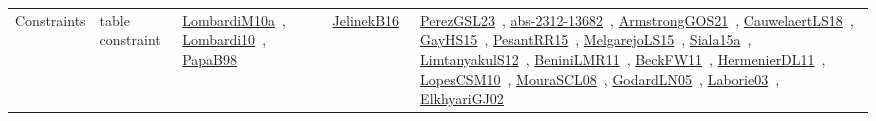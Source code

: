{\begin{longtable}{lp{3cm}>{\raggedright\arraybackslash}p{6cm}>{\raggedright\arraybackslash}p{6cm}>{\raggedright\arraybackslash}p{8cm}}
Constraints & table constraint & \href{works/LombardiM10a.pdf}{LombardiM10a}~\cite{LombardiM10a}, \href{works/Lombardi10.pdf}{Lombardi10}~\cite{Lombardi10}, \href{works/PapaB98.pdf}{PapaB98}~\cite{PapaB98} & \href{works/JelinekB16.pdf}{JelinekB16}~\cite{JelinekB16} & \href{works/PerezGSL23.pdf}{PerezGSL23}~\cite{PerezGSL23}, \href{works/abs-2312-13682.pdf}{abs-2312-13682}~\cite{abs-2312-13682}, \href{works/ArmstrongGOS21.pdf}{ArmstrongGOS21}~\cite{ArmstrongGOS21}, \href{works/CauwelaertLS18.pdf}{CauwelaertLS18}~\cite{CauwelaertLS18}, \href{works/GayHS15.pdf}{GayHS15}~\cite{GayHS15}, \href{works/PesantRR15.pdf}{PesantRR15}~\cite{PesantRR15}, \href{works/MelgarejoLS15.pdf}{MelgarejoLS15}~\cite{MelgarejoLS15}, \href{works/Siala15a.pdf}{Siala15a}~\cite{Siala15a}, \href{works/LimtanyakulS12.pdf}{LimtanyakulS12}~\cite{LimtanyakulS12}, \href{works/BeniniLMR11.pdf}{BeniniLMR11}~\cite{BeniniLMR11}, \href{works/BeckFW11.pdf}{BeckFW11}~\cite{BeckFW11}, \href{works/HermenierDL11.pdf}{HermenierDL11}~\cite{HermenierDL11}, \href{works/LopesCSM10.pdf}{LopesCSM10}~\cite{LopesCSM10}, \href{works/MouraSCL08.pdf}{MouraSCL08}~\cite{MouraSCL08}, \href{works/GodardLN05.pdf}{GodardLN05}~\cite{GodardLN05}, \href{works/Laborie03.pdf}{Laborie03}~\cite{Laborie03}, \href{works/ElkhyariGJ02.pdf}{ElkhyariGJ02}~\cite{ElkhyariGJ02}\\
\end{longtable}
}

